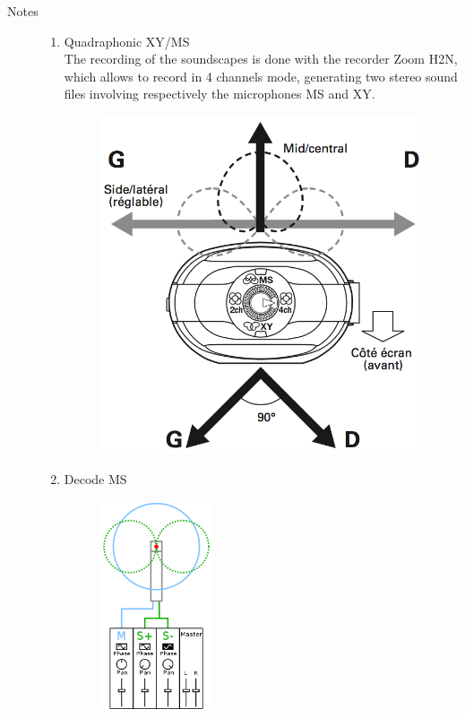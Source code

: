 \begin{description}
\item[Notes] \hfill 
\label{mp:msxy}
\begin{enumerate}
\item Quadraphonic XY/MS\\
The recording of the soundscapes is done with the recorder Zoom H2N, which allows to record in 4 channels mode, generating two stereo sound files involving respectively the microphones MS and XY.
 \begin{figure}[H]
\begin{center}
\includegraphics[scale=0.23]{mp/img/H2N.png}
\end{center}
\end{figure}
\item Decode MS\\
\begin{figure}[!hbt]
	\begin{center}
		\includegraphics[width=33mm]{mp/img/MS}

\end{center}
\end{figure}
\end{enumerate}
\end{description}
